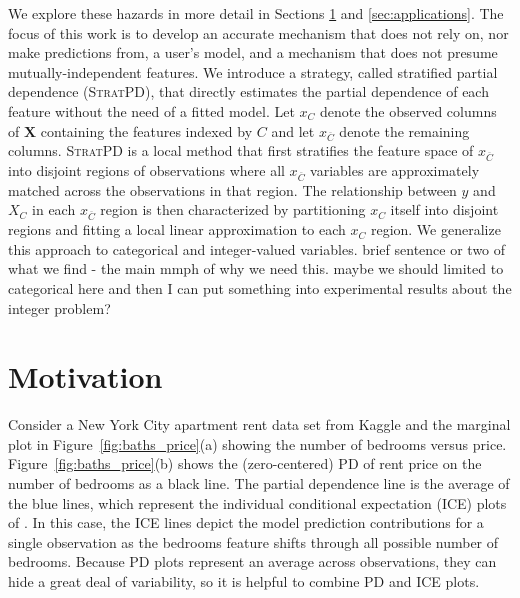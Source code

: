 \documentclass[12pt]{article}
\newcommand{\figref}[1]{Figure~\ref{#1}}
\newcommand{\cut}[1]{}
\newcommand{\spd}{\fontfamily{cmr}\textsc{\small StratPD}}
\newcommand{\xnC}{$x_{\overline{C}}$}
\begin{document}
We explore these hazards in more detail in Sections \ref{sec:motivation} and \ref{sec:applications}. The focus of this work is to develop an accurate mechanism that does not rely on, nor make predictions from, a user's model, and a mechanism that does not presume mutually-independent features. We introduce a strategy, called stratified partial dependence (\spd{}), that directly estimates the partial dependence of each feature without the need of a fitted model. Let ${x}_C$ denote the observed columns of $\mathbf{X}$ containing the features indexed by $C$ and let ${x}_{\overline{C}}$ denote the remaining columns. \spd{} is a local method that first stratifies the feature space of \xnC{} into disjoint regions of observations where all \xnC{} variables are approximately matched across the observations in that region. The relationship between $y$ and $X_C$ in each \xnC{} region is then characterized by partitioning ${x}_C$ itself into disjoint regions and fitting a local linear approximation to each ${x}_C$ region. We generalize this approach to categorical and integer-valued variables. {\color{red} brief sentence or two of what we find - the main mmph of why we need this. maybe we should limited to categorical here and then I can put something into experimental results about the integer problem?}

\section{Motivation}\label{sec:motivation}
\cut{\cite{PDP} introduced partial dependence (PD) plots as a way to extract and visualize the dependence of the target on one or two features of interest.} Consider a New York City apartment rent data set from Kaggle \cite{rent-dataset} and the marginal plot in \figref{fig:baths_price}(a) showing the number of bedrooms versus price.  \figref{fig:baths_price}(b) shows the (zero-centered) PD of rent price on the number of bedrooms as a black line. The partial dependence line is the average of the blue lines, which represent the individual conditional expectation (ICE) plots of \cite{ICE}.  In this case, the ICE lines depict the model prediction contributions for a single observation as the bedrooms feature shifts through all possible number of bedrooms. Because PD plots represent an average across observations, they can hide a great deal of variability, so it is helpful to combine PD and ICE plots.
\end{document}
